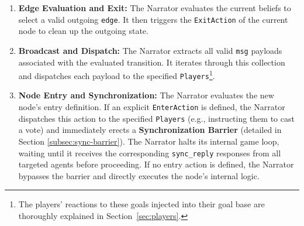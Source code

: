 \begin{enumerate}
    \item \textbf{Edge Evaluation and Exit:} The Narrator evaluates the current beliefs to select a valid outgoing \texttt{edge}. It then triggers the \texttt{ExitAction} of the current node to clean up the outgoing state.
    
    \item \textbf{Broadcast and Dispatch:} The Narrator extracts all valid \texttt{msg} payloads associated with the evaluated transition. It iterates through this collection and dispatches each payload to the specified \texttt{Players}\footnote{The players' reactions to these goals injected into their goal base are thoroughly explained in Section~\ref{sec:players}.}.
    
    \item \textbf{Node Entry and Synchronization:} The Narrator evaluates the new node's entry definition. If an explicit \texttt{EnterAction} is defined, the Narrator dispatches this action to the specified \texttt{Players} (e.g., instructing them to cast a vote) and immediately erects a \textbf{Synchronization Barrier} (detailed in Section \ref{subsec:sync-barrier}). The Narrator halts its internal game loop, waiting until it receives the corresponding \texttt{sync\_reply} responses from all targeted agents before proceeding. If no entry action is defined, the Narrator bypasses the barrier and directly executes the node's internal logic.
\end{enumerate}

